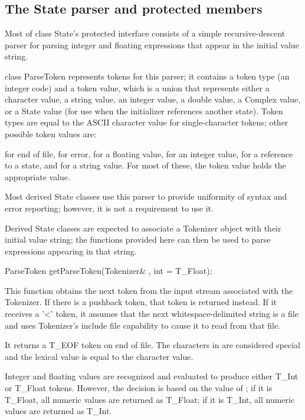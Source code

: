 \subsection{The State parser and protected members}

Most of class State's protected interface consists of a simple
recursive-descent parser for parsing integer and floating expressions
that appear in the initial value string.

class ParseToken represents tokens for this parser; it contains a
token type (an integer code) and a token value, which is a
union that represents either a character value, a string value, an
integer value, a double value, a Complex value, or a State value
(for use when the initializer references another state).  Token
types are equal to the ASCII character value for single-character
tokens; other possible token values are:

 for end of file,  for error, 
for a floating value,  for an integer value, 
for a reference to a state, and  for a string value.
For most of these, the token value holds the appropriate value.

Most derived State classes use this parser to provide uniformity
of syntax and error reporting; however, it is not a requirement to
use it.

Derived State classes are expected to associate a Tokenizer object
with their initial value string; the functions provided here can
then be used to parse expressions appearing in that string.

\begin{example}
ParseToken getParseToken(Tokenizer& , int = T_Float);
\end{example}

This function obtains the next token from the input stream associated
with the Tokenizer.  If there is a pushback token, that token is
returned instead.  If it receives a '<' token, it assumes that the
next whitespace-delimited string is a file and uses Tokenizer's include
file capability to cause it to read from that file.

It returns a T_EOF token on end of file.  The characters in \code{,[]+*-/()^}
are considered special and the lexical value is equal to the character
value.

Integer and floating values are recognized and evaluated to produce
either T_Int or T_Float tokens.  However, the decision is based on
the value of ; if it is T_Float, all numeric values
are returned as T_Float; if it is T_Int, all numeric values are returned
as T_Int.

